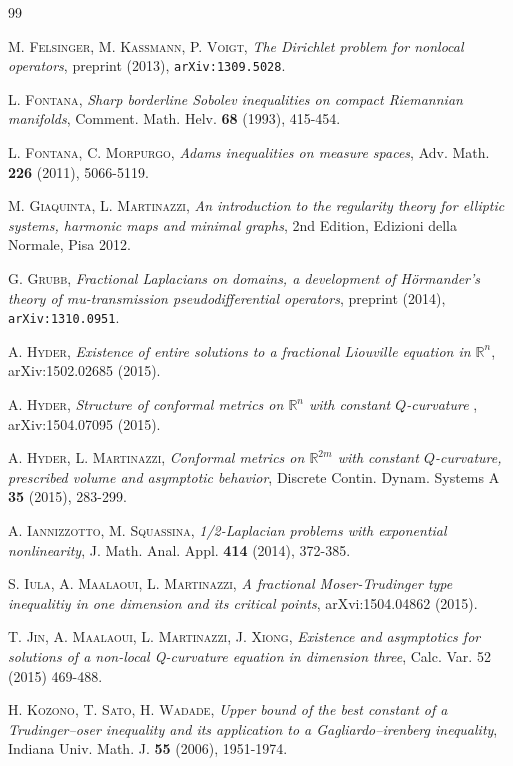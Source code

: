 \documentclass[11pt, a4paper]{article}
\begin{document}
\begin{thebibliography}{99}
\begin{small}

 \textsc{M. Felsinger, M. Kassmann, P. Voigt}, \emph{The Dirichlet problem for nonlocal operators}, preprint (2013), \texttt{arXiv:1309.5028}.

 \textsc{L. Fontana}, \emph{Sharp borderline Sobolev inequalities on compact Riemannian manifolds}, Comment. Math. Helv. \textbf{68} (1993), 415-454.

 \textsc{L. Fontana, C. Morpurgo}, \emph{Adams inequalities on measure spaces}, Adv. Math. \textbf{226} (2011), 5066-5119.

 \textsc{M. Giaquinta, L. Martinazzi}, \emph{An introduction to the regularity theory for elliptic systems, harmonic maps and minimal graphs}, 2nd Edition, Edizioni della Normale, Pisa 2012.

 \textsc{G. Grubb}, \emph{Fractional Laplacians on domains, a development of H\"ormander's theory of mu-transmission pseudodifferential operators}, preprint (2014), \texttt{arXiv:1310.0951}.

 \textsc{A. Hyder}, \emph{Existence of entire solutions to a fractional Liouville equation in $\mathbb{R}^n$}, arXiv:1502.02685 (2015).

 \textsc{A. Hyder}, \emph{Structure of conformal metrics on $\mathbb{R}^n$ with constant $Q$-curvature }, arXiv:1504.07095 (2015).

 \textsc{A. Hyder, L. Martinazzi}, \emph{Conformal metrics on $\mathbb{R}^{2m}$ with constant $Q$-curvature, prescribed volume and asymptotic behavior}, Discrete Contin. Dynam. Systems A \textbf{35} (2015), 283-299.


 \textsc{A. Iannizzotto, M. Squassina}, \emph{1/2-Laplacian problems with exponential nonlinearity},
J. Math. Anal. Appl. \textbf{414} (2014), 372-385.

 \textsc{S. Iula, A. Maalaoui, L. Martinazzi}, \emph{A fractional Moser-Trudinger type inequalitiy in one dimension and its critical points}, arXvi:1504.04862 (2015).

 \textsc{T. Jin, A. Maalaoui, L. Martinazzi, J. Xiong}, \emph{Existence and asymptotics for solutions of a non-local Q-curvature equation in dimension three}, Calc. Var. {52} (2015) 469-488.

 \textsc{H. Kozono, T. Sato, H. Wadade}, \emph{Upper bound of the best constant of a Trudinger--oser inequality and its application to a Gagliardo--irenberg inequality}, Indiana Univ. Math. J. \textbf{55} (2006), 1951-1974.


\end{small}
\end{thebibliography}
\end{document}
